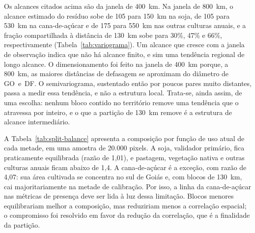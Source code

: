 Os alcances citados acima são da janela de 400~km. Na janela de 800~km, o alcance estimado do
resíduo sobe de 105 para 150~km na soja, de 105 para 530~km na cana-de-açúcar e de 175 para 550~km nas
outras culturas anuais, e a fração compartilhada à distância de 130~km sobe para 30\%, 47\% e
66\%, respectivamente (Tabela~\ref{tab:variograma}). Um alcance que cresce com a janela de
observação indica que não há alcance finito, e sim uma tendência regional de longo alcance. O
dimensionamento foi feito na janela de 400~km porque, a 800~km, as maiores distâncias de defasagem se
aproximam do diâmetro de GO~e~DF. O semivariograma, sustentado então por poucos pares muito distantes,
passa a medir essa tendência, e não a estrutura local. Trata-se, ainda assim, de uma escolha: nenhum
bloco contido no território remove uma tendência que o atravessa por inteiro, e o que a partição de
130~km remove é a estrutura de alcance intermediário.

A Tabela~\ref{tab:split-balance} apresenta a composição por função de uso atual de cada metade, em
uma amostra de 20.000 pixels. A soja, validador primário, fica praticamente equilibrada (razão de 1,01),
e pastagem, vegetação nativa e outras culturas anuais ficam abaixo de 1,4. A cana-de-açúcar é a
exceção, com razão de 4,07: sua área cultivada se concentra no sul de Goiás e, com blocos de
130~km, cai majoritariamente na metade de calibração. Por isso, a linha da cana-de-açúcar nas métricas
de presença deve ser lida à luz dessa limitação. Blocos menores equilibrariam melhor a composição, mas
reduziriam menos a correlação espacial; o compromisso foi resolvido em favor da redução da correlação,
que é a finalidade da partição.

\begin{table}[htbp]
\centering
\caption{Composição por função de uso atual (MapBiomas) de cada metade da partição espacial,
em número de pixels de uma amostra de 20.000 pontos (semente 7, 250~m).}
\label{tab:split-balance}

\end{table}
